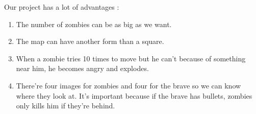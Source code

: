 Our project has a lot of advantages :
\begin{enumerate}
\item The number of zombies can be as big as we want.
\\

\item The map can have another form than a square.
\\

\item When a zombie tries 10 times to move but he can't because of something near him, he becomes angry and explodes.
\\

\item There're four images for zombies and four for the brave so we can know where they look at. It's important because if the brave has bullets, zombies only kills him if they're behind.
\end{enumerate}
